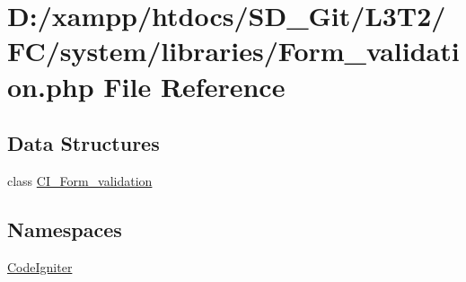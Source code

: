 \hypertarget{_form__validation_8php}{}\section{D\+:/xampp/htdocs/\+S\+D\+\_\+\+Git/\+L3\+T2/\+F\+C/system/libraries/\+Form\+\_\+validation.php File Reference}
\label{_form__validation_8php}
\subsection*{Data Structures}
\begin{DoxyCompactItemize}
\item 
class \hyperlink{class_c_i___form__validation}{C\+I\+\_\+\+Form\+\_\+validation}
\end{DoxyCompactItemize}
\subsection*{Namespaces}
\begin{DoxyCompactItemize}
\item 
 \hyperlink{namespace_code_igniter}{Code\+Igniter}
\end{DoxyCompactItemize}
